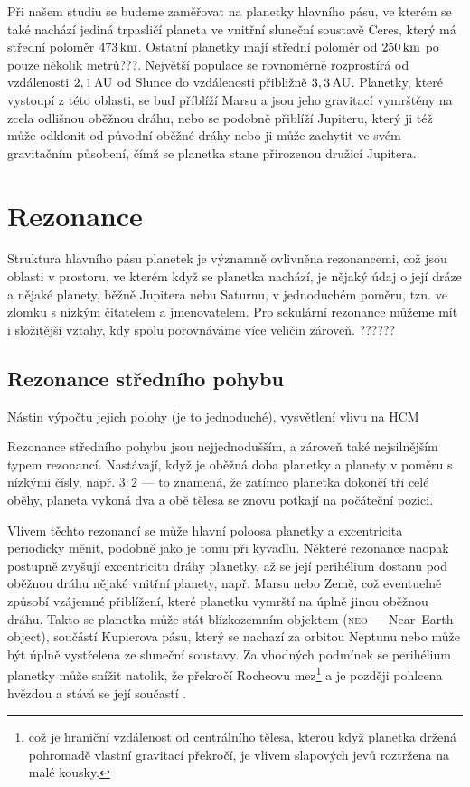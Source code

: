 \documentclass[A4paper, 12pt, oneside]{book}
\newcommand{\C}[1]{\textsc{#1}}
\begin{document}
Při našem studiu se budeme zaměřovat na planetky hlavního pásu, ve kterém se také nachází jediná trpasličí planeta ve vnitřní sluneční soustavě Ceres, který má střední poloměr $473\, {\rm km}$. Ostatní planetky mají střední poloměr od $250\, {\rm km}$ po pouze několik metrů???. Největší populace se rovnoměrně rozprostírá od vzdálenosti $2,1\, {\rm AU}$ od Slunce do vzdálenosti přibližně $3,3\, {\rm AU}$. Planetky, které vystoupí z této oblasti, se buď příblíží Marsu a jsou jeho gravitací vymrštěny na zcela odlišnou oběžnou dráhu, nebo se podobně přiblíží Jupiteru, který ji též může odklonit od původní oběžné dráhy nebo ji může zachytit ve svém gravitačním působení, čímž se planetka stane přirozenou družicí Jupitera. 

\section{Rezonance}
Struktura hlavního pásu planetek je významně ovlivněna rezonancemi, což jsou oblasti v prostoru, ve kterém když se planetka nachází, je nějaký údaj o její dráze a nějaké planety, běžně Jupitera nebu Saturnu, v jednoduchém poměru, tzn. ve zlomku s nízkým čitatelem a jmenovatelem. Pro sekulární rezonance můžeme mít i složitější vztahy, kdy spolu porovnáváme více veličin zároveň. ??????
\subsection{Rezonance středního pohybu}
Nástin výpočtu jejich polohy (je to jednoduché), vysvětlení vlivu na HCM

Rezonance středního pohybu jsou nejjednodušším, a zároveň také nejsilnějším typem rezonancí. Nastávají, když je oběžná doba planetky a planety v poměru s nízkými čísly, např. $3:2$ --- to znamená, že zatímco planetka dokončí tři celé oběhy, planeta vykoná dva a obě tělesa se znovu potkají na počáteční pozici. 

Vlivem těchto rezonancí se může hlavní poloosa planetky a excentricita periodicky měnit, podobně jako je tomu při kyvadlu. Některé rezonance naopak postupně zvyšují excentricitu dráhy planetky, až se její perihélium dostanu pod oběžnou dráhu nějaké vnitřní planety, např. Marsu nebo Země, což eventuelně způsobí vzájemné přiblížení, které planetku vymrští na úplně jinou oběžnou dráhu. Takto se planetka může stát blízkozemním objektem (\C{neo} --- Near--Earth object), součástí Kupierova pásu, který se nachazí za orbitou Neptunu nebo může být úplně vystřelena ze sluneční soustavy. Za vhodných podmínek se perihélium planetky může snížit natolik, že překročí Rocheovu mez\footnote{což je hraniční vzdálenost od centrálního tělesa, kterou když planetka držená pohromadě vlastní gravitací překročí, je vlivem slapových jevů roztržena na malé kousky.} a je později pohlcena hvězdou a stává se její součastí \cite{pichierri17}.
\end{document}
